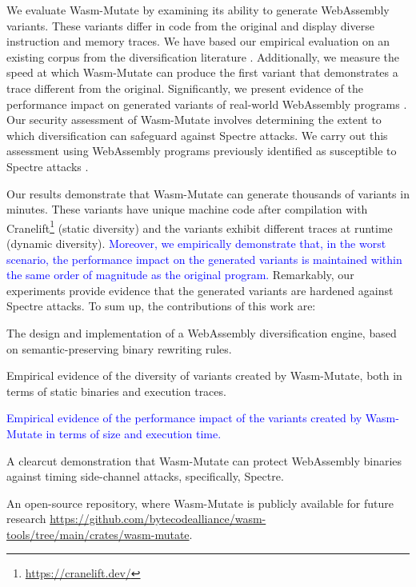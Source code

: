 \documentclass[a4paper,fleqn]{cas-dc}
\newcommand*\badge[1]{ \colorbox{red}{\color{white}#1}}
\newcommand{\tool}{{\sc Wasm-Mutate}\xspace}
\newcommand{\Wasm}{WebAssembly\xspace}
\newcommand{\wasm}{\Wasm}
\newenvironment{revision1}{\color{blue}}{}
\newcommand{\revision}[1]{\textcolor{blue}{#1}}
\newcommand{\repourl}{\url{https://github.com/bytecodealliance/wasm-tools/tree/main/crates/wasm-mutate}}
\newcommand{\todo}[1]{%
\refstepcounter{todo}
\noindent\textbf{\badge{TODO}} {\color{red}#1}
\addcontentsline{td}{todo}
{\color{red}\thesection.\thetodo\xspace #1}}
\begin{document}


\begin{revision1}
    
    We evaluate \tool by examining its ability to generate \Wasm variants.
    These variants differ in code from the original and display diverse instruction and memory traces.
    We have based our empirical evaluation on an existing corpus from the diversification literature \cite{arteaga2020crow, hilbig2021empirical, Swivel}.
    Additionally, we measure the speed at which \tool can produce the first variant that demonstrates a trace different from the original.
    Significantly, we present evidence of the performance impact on generated variants of real-world \Wasm programs \cite{hilbig2021empirical}.
    Our security assessment of \tool involves determining the extent to which diversification can safeguard against Spectre attacks. 
    We carry out this assessment using \wasm programs previously identified as susceptible to Spectre attacks \cite{Swivel}.
\end{revision1}


Our results demonstrate that \tool can generate thousands of variants in minutes. These variants have unique machine code after compilation with Cranelift\footnote{\url{https://cranelift.dev/}} (static diversity) and the variants exhibit different traces at runtime (dynamic diversity).
\revision{Moreover, we empirically demonstrate that, in the worst scenario, the performance impact on the generated variants is maintained within the same order of magnitude as the original program.}
Remarkably, our experiments provide evidence that the generated variants are hardened against Spectre attacks.
To sum up, the contributions of this work are:

\begin{itemize}
    \item The design and implementation of a \Wasm diversification engine, based on semantic-preserving binary rewriting rules.
    \item Empirical evidence of the diversity of variants created by \tool, both in terms of static binaries and execution traces.
    \revision{
        \item Empirical evidence of the performance impact of the variants created by \tool in terms of size and execution time.
    }
    \item A clearcut demonstration that \tool can protect \wasm binaries against timing side-channel attacks, specifically, Spectre.
    \item An open-source repository, where \tool is publicly available for future research \repourl.    
\end{itemize}
\end{document}
